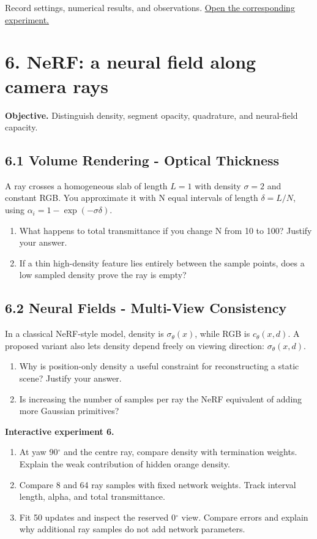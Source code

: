 \documentclass[11pt,a4paper]{article}
\begin{document}
Record settings, numerical results, and observations.
\href{https://sosekie.github.io/Unibe-CVG-CV-Interactive-Labs/tutorial-09/#reconstruction}{Open the corresponding experiment.}\par
{}\section*{6. NeRF: a neural field along camera rays}
\noindent\textbf{Objective.} Distinguish density, segment opacity, quadrature, and neural-field capacity.
\subsection*{6.1 Volume Rendering - Optical Thickness}
A ray crosses a homogeneous slab of length $L=1$ with density $\sigma=2$ and constant RGB.
You approximate it with N equal intervals of length $\delta=L/N$, using $\alpha_i=1-\exp(-\sigma\delta)$.
\begin{enumerate}[label=(\alph*),nosep]
\item What happens to total transmittance if you change N from 10 to 100?
Justify your answer.
\item If a thin high-density feature lies entirely between the sample points, does a low sampled density prove the ray is empty?
\end{enumerate}
\subsection*{6.2 Neural Fields - Multi-View Consistency}
In a classical NeRF-style model, density is $\sigma_\theta(x)$, while RGB is $c_\theta(x,d)$.
A proposed variant also lets density depend freely on viewing direction: $\sigma_\theta(x,d)$.
\begin{enumerate}[label=(\alph*),nosep]
\item Why is position-only density a useful constraint for reconstructing a static scene?
Justify your answer.
\item Is increasing the number of samples per ray the NeRF equivalent of adding more Gaussian primitives?
\end{enumerate}
\noindent\textbf{Interactive experiment 6.}\begin{enumerate}[nosep]
\item At yaw 90${}^\circ$ and the centre ray, compare density with termination weights.
Explain the weak contribution of hidden orange density.
\item Compare 8 and 64 ray samples with fixed network weights.
Track interval length, alpha, and total transmittance.
\item Fit 50 updates and inspect the reserved 0${}^\circ$ view.
Compare errors and explain why additional ray samples do not add network parameters.
\end{enumerate}
\end{document}
